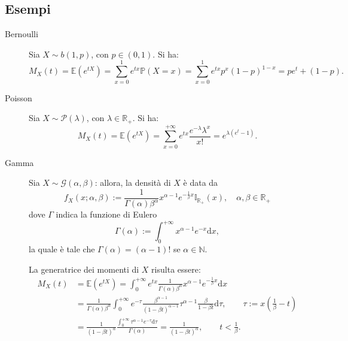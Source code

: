\subsection{Esempi}
\begin{description}
\item[Bernoulli] Sia \(X \sim b(1,p)\), con \(p \in (0,1)\). Si ha:
\begin{equation*}
  M_X (t) = \mathbb{E}(e^{tX})
          = \sum_{x=0}^1 e^{tx} \mathbb{P}(X=x)
          = \sum_{x=0}^1 e^{tx} p^x (1-p)^{1-x}
          = p e^t + (1-p).
\end{equation*}

\item[Poisson] Sia \(X \sim \mathcal{P}(\lambda)\), con \(\lambda \in \mathbb{R}_+\). Si ha:
\begin{equation*}
  M_X (t) = \mathbb{E}(e^{tX}) 
          = \sum_{x=0}^{+\infty} e^{tx} \frac{e^{-\lambda} \lambda^x}{x!}
          = e^{\lambda (e^t -1)}.
\end{equation*}

\item[Gamma] Sia \(X \sim \mathcal{G}(\alpha, \beta)\): allora, la densità di \(X\) è data da 
\begin{equation*}
  f_X (x; \alpha, \beta) := \frac{1}{\Gamma (\alpha) \beta^{\alpha}} x^{\alpha -1} e^{-\frac{1}{\beta} x} \mathbb{I}_{\mathbb{R}_+}(x), \quad
  \alpha, \beta \in \mathbb{R}_+
\end{equation*}
dove \(\Gamma{}\) indica la funzione di Eulero
\begin{equation*}
  \Gamma(\alpha) := \int_0^{+\infty} \! x^{\alpha -1} e^{-x} \mathrm{d}x,
\end{equation*}
la quale è tale che \(\Gamma(\alpha) = (\alpha - 1)!\) se \(\alpha \in \mathbb{N}\).

La generatrice dei momenti di \(X\) risulta essere: 
\begin{align*}
  M_X (t)	&= \mathbb{E}(e^{tX})
           = \int_0^{+\infty} \! e^{tx} \frac{1}{\Gamma (\alpha) 
            \beta^{\alpha}} x^{\alpha -1} e^{-\frac{1}{\beta} x} \mathrm{d}x \\
          &= \frac{1}{\Gamma(\alpha)\beta^{\alpha}}
             \int_0^{+\infty} e^{-\tau}
             \frac{\beta^{\alpha-1}}{(1-\beta t)^{\alpha-1}}
             \tau^{\alpha-1}
             \frac{\beta}{1-\beta t}\mathrm{d}\tau,\qquad \tau := x\left(\frac{1}{\beta} - t\right) \\
          &= \frac{1}{(1-\beta t)^{\alpha}}
             \frac{\int_0^{+\infty} \! \tau^{\alpha-1} e^{-\tau} \mathrm{d}\tau}%
             {\Gamma(\alpha)}
           = \frac{1}{(1-\beta t)^{\alpha}}, \qquad t < \frac{1}{\beta}.
\end{align*}
\end{description}

